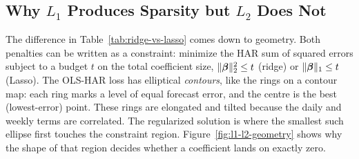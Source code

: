 \subsection{Why $L_1$ Produces Sparsity but $L_2$ Does Not}

The difference in Table~\ref{tab:ridge-vs-lasso} comes down to geometry.
Both penalties can be written as a constraint: minimize the HAR sum of squared errors subject to a budget $t$ on the total coefficient size, $\lVert\bm{\beta}\rVert_2^2 \leq t$ (ridge) or $\lVert\bm{\beta}\rVert_1 \leq t$ (Lasso).
The OLS-HAR loss has elliptical \emph{contours}, like the rings on a contour map: each ring marks a level of equal forecast error, and the centre is the best (lowest-error) point.
These rings are elongated and tilted because the daily and weekly terms are correlated.
The regularized solution is where the smallest such ellipse first touches the constraint region.
Figure~\ref{fig:l1-l2-geometry} shows why the shape of that region decides whether a coefficient lands on exactly zero.


